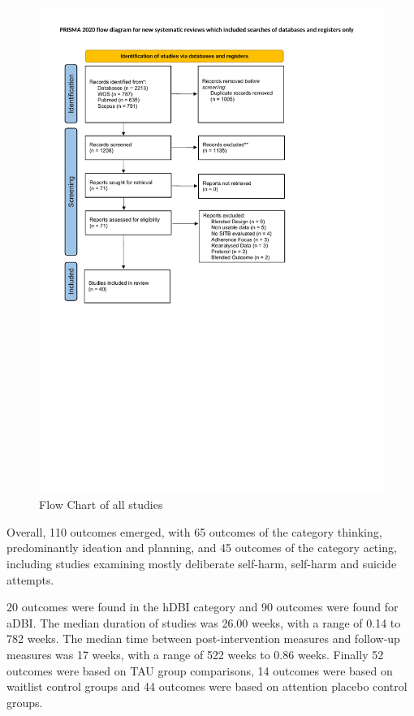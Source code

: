 \documentclass[
  english,
  man]{apa6}
\begin{document}
\begin{figure}
\centering
\includegraphics{01_Plots_Tables/DBI_Flow_Chart.pdf}
\caption{Flow Chart of all studies}
\end{figure}

Overall, 110 outcomes emerged, with 65 outcomes of the category thinking, predominantly ideation and planning, and 45 outcomes of the category acting, including studies examining mostly deliberate self-harm, self-harm and suicide attempts.

20 outcomes were found in the hDBI category and 90 outcomes were found for aDBI. The median duration of studies was 26.00 weeks, with a range of 0.14 to 782 weeks. The median time between post-intervention measures and follow-up measures was 17 weeks, with a range of 522 weeks to 0.86 weeks. Finally 52 outcomes were based on TAU group comparisons, 14 outcomes were based on waitlist control groups and 44 outcomes were based on attention placebo control groups.
\end{document}
